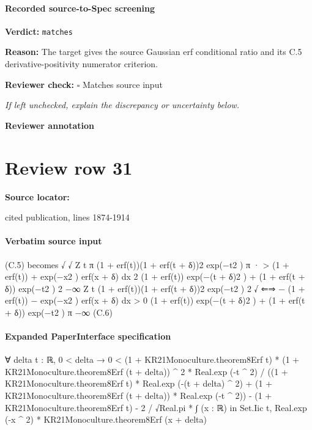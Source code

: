 \documentclass[10pt]{article}
\newcommand{\reviewerbox}{%
  \par\noindent\fbox{\parbox{0.96\linewidth}{\rule{0pt}{0.38in}}}\par
}
\newcommand{\reviewmatch}[1]{%
  \par\noindent\textbf{Reviewer check:} $\square$\; #1\par
  \noindent\emph{If left unchecked, explain the discrepancy or uncertainty below.}\par
}
\begin{document}
\paragraph{Recorded source-to-Spec screening}
\textbf{Verdict:} \texttt{matches}
\\
{\raggedright
\textbf{Reason:} The target gives the source Gaussian erf conditional ratio and its C.\allowbreak{}5 derivative-\allowbreak{}positivity numerator criterion.\allowbreak{}
\par}
\reviewmatch{Matches source input}
\noindent\textbf{Reviewer annotation}\par
\reviewerbox
\clearpage
\hypertarget{source-claim-c25f59d1a0e8be35}{}
\section*{Review row 31}
\textbf{Source locator:} {\footnotesize\raggedright cited publication, lines 1874-\allowbreak{}1914\par}
\paragraph{Verbatim source input}
\begin{ReviewVerbatim}
(C.5) becomes
√
√
Z t
π
(1 + erf(t))(1 + erf(t + δ))2 exp(−t2 )
π
·
>
(1
+
erf(t))
+
exp(−x2 ) erf(x + δ) dx
2 (1 + erf(t)) exp(−(t + δ)2 ) + (1 + erf(t + δ)) exp(−t2 )
2
−∞
Z t
(1 + erf(t))(1 + erf(t + δ))2 exp(−t2 )
2
√
⇐⇒
−
(1
+
erf(t))
−
exp(−x2 ) erf(x + δ) dx > 0
(1 + erf(t)) exp(−(t + δ)2 ) + (1 + erf(t + δ)) exp(−t2 )
π −∞
(C.6)
\end{ReviewVerbatim}



\paragraph{Expanded PaperInterface specification}
\begin{ReviewVerbatim}
∀ {delta t : ℝ},
  0 < delta →
    0 <
      (1 + KR21Monoculture.theorem8Erf t) * (1 + KR21Monoculture.theorem8Erf (t + delta)) ^ 2 * Real.exp (-t ^ 2) /
            ((1 + KR21Monoculture.theorem8Erf t) * Real.exp (-(t + delta) ^ 2) +
              (1 + KR21Monoculture.theorem8Erf (t + delta)) * Real.exp (-t ^ 2)) -
          (1 + KR21Monoculture.theorem8Erf t) -
        2 / √Real.pi * ∫ (x : ℝ) in Set.Iic t, Real.exp (-x ^ 2) * KR21Monoculture.theorem8Erf (x + delta)
\end{ReviewVerbatim}
\end{document}
